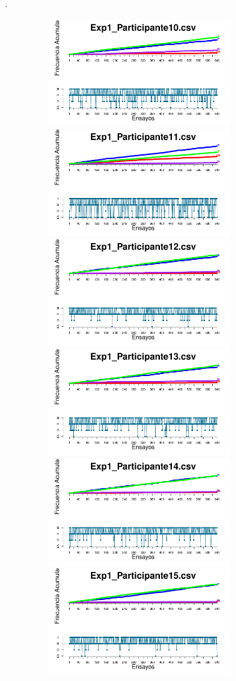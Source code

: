 \documentclass[a4paper ]{article}
\begin{document}
\vfill .
\begin{figure}[th]
\begin{center}
\includegraphics[width=8cm, height=4cm]{Figures/Outcome_Exp1_P10} \includegraphics[width=8cm, height=4cm]{Figures/Outcome_Exp1_P11} \includegraphics[width=8cm, height=4cm]{Figures/Outcome_Exp1_P12}
\includegraphics[width=8cm, height=4cm]{Figures/Outcome_Exp1_P13} \includegraphics[width=8cm, height=4cm]{Figures/Outcome_Exp1_P14} \includegraphics[width=8cm, height=4cm]{Figures/Outcome_Exp1_P15}

\end{center}
\end{figure}
\end{document}
